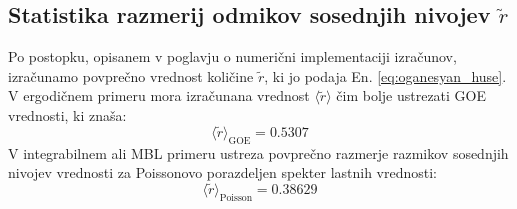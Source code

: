  \subsection{Statistika razmerij odmikov sosednjih nivojev $\tilde{r}$}
 \label{statistika_razmerij_odmikov}
 Po postopku, opisanem v poglavju o numerični implementaciji izračunov, izračunamo povprečno vrednost količine $\tilde{r}$, ki jo podaja En. \eqref{eq:oganesyan_huse}. V ergodičnem primeru mora izračunana vrednost $\langle \tilde{r}\rangle$ čim bolje ustrezati GOE vrednosti, ki znaša:
 \begin{equation}\label{eq:r_GOE}
 \langle \tilde{r}\rangle_\mathrm{GOE}=0.5307
 \end{equation}
 V integrabilnem ali MBL primeru ustreza povprečno razmerje razmikov sosednjih nivojev vrednosti za Poissonovo porazdeljen spekter lastnih vrednosti: 
 \begin{equation}\label{eq:r_poisson}
 \langle \tilde{r}\rangle_\mathrm{Poisson}=0.38629
 \end{equation}

